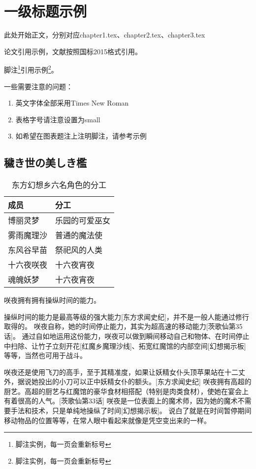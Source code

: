 \chapter{一级标题示例}
此处开始正文，分别对应chapter1.tex、chapter2.tex、chapter3.tex

论文引用示例\cite{王宣承-1}，文献按照国标2015格式引用。

脚注\footnote{脚注实例，每一页会重新标号}引用示例\footnote{脚注实例，每一页会重新标号}。

一些需要注意的问题：
\begin{enumerate}
    \item 英文字体全部采用Times New Roman
    \item 表格字号请注意设置为small
    \item 如希望在图表题注上注明脚注，请参考示例
\end{enumerate}

\section{穢き世の美しき檻}

\begin{table}
    \centering
    \small
    \caption{东方幻想乡六名角色的分工}
    \begin{tabularx}{\textwidth}{X >{\centering\arraybackslash}X}
        \toprule[1.0bp]
        成员    & 分工      \\
        \midrule[0.75bp]
        博丽灵梦  & 乐园的可爱巫女 \\
        雾雨魔理沙 & 普通的魔法使  \\
        东风谷早苗 & 祭祀风的人类  \\
        十六夜咲夜 & 十六夜宵夜   \\
        魂魄妖梦  & 十六夜宵夜   \\
        \bottomrule[1.0bp]
    \end{tabularx}
    \vspace{4bp}
\end{table}

咲夜拥有拥有操纵时间的能力。

操纵时间的能力是最高等级的强大能力[东方求闻史纪]，并不是一般人能通过修行取得的。
咲夜自称，她的时间停止能力，其实为超高速的移动能力[茨歌仙第35话]。
通过自如地运用这份能力，咲夜可以做到瞬间移动自己和物体、在时间停止中扫除、让竹子立刻开花[红魔乡魔理沙线]、拓宽红魔馆的内部空间[幻想揭示板]等等，当然也可用于战斗。

咲夜还是使用飞刀的高手，至于其精准度，如果让妖精女仆头顶苹果站在十二丈外，据说她投出的小刀可以正中妖精女仆的额头。[东方求闻史纪]
咲夜拥有高超的厨艺。高超的厨艺与红魔馆的豪华食材相搭配（特别是肉类食材），使她在宴会上有着很高的人气。[茨歌仙第33话]
咲夜是一位表面上的魔术师，因为她的魔术不需要手法和技术，只是单纯地操纵了时间[幻想揭示板]。 说白了就是在时间暂停期间移动物品的位置等等，在常人眼中看起来就像是凭空变出来的一样。
